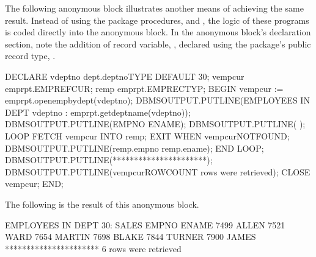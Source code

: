 \documentclass[letterpaper,10pt,english,openany,oneside]{sphinxmanual}
\begin{document}
The following anonymous block illustrates another means of achieving the
same result. Instead of using the package procedures,  and
, the logic of these programs is coded directly into the
anonymous block. In the anonymous block’s declaration section, note the
addition of record variable, , declared using the package’s public
record type, .

%
\begin{sphinxVerbatim}[commandchars=\\\{\}]
DECLARE
    v\PYGZus{}deptno     dept.deptno\PYGZpc{}TYPE DEFAULT 30;
    v\PYGZus{}emp\PYGZus{}cur    emp\PYGZus{}rpt.EMP\PYGZus{}REFCUR;
    r\PYGZus{}emp        emp\PYGZus{}rpt.EMPREC\PYGZus{}TYP;
BEGIN
   v\PYGZus{}emp\PYGZus{}cur := emp\PYGZus{}rpt.open\PYGZus{}emp\PYGZus{}by\PYGZus{}dept(v\PYGZus{}deptno);
   DBMS\PYGZus{}OUTPUT.PUT\PYGZus{}LINE(\PYGZsq{}EMPLOYEES IN DEPT \PYGZsh{}\PYGZsq{} \textbar{}\textbar{} v\PYGZus{}deptno \textbar{}\textbar{}
       \PYGZsq{}: \PYGZsq{} \textbar{}\textbar{} emp\PYGZus{}rpt.get\PYGZus{}dept\PYGZus{}name(v\PYGZus{}deptno));
   DBMS\PYGZus{}OUTPUT.PUT\PYGZus{}LINE(\PYGZsq{}EMPNO ENAME\PYGZsq{});
   DBMS\PYGZus{}OUTPUT.PUT\PYGZus{}LINE(\PYGZsq{}\PYGZhy{}\PYGZhy{}\PYGZhy{}\PYGZhy{}\PYGZhy{} \PYGZhy{}\PYGZhy{}\PYGZhy{}\PYGZhy{}\PYGZhy{}\PYGZhy{}\PYGZhy{}\PYGZsq{});
   LOOP
       FETCH v\PYGZus{}emp\PYGZus{}cur INTO r\PYGZus{}emp;
       EXIT WHEN v\PYGZus{}emp\PYGZus{}cur\PYGZpc{}NOTFOUND;
       DBMS\PYGZus{}OUTPUT.PUT\PYGZus{}LINE(r\PYGZus{}emp.empno \textbar{}\textbar{} \PYGZsq{} \PYGZsq{} \textbar{}\textbar{}
       r\PYGZus{}emp.ename);
   END LOOP;
   DBMS\PYGZus{}OUTPUT.PUT\PYGZus{}LINE(\PYGZsq{}**********************\PYGZsq{});
   DBMS\PYGZus{}OUTPUT.PUT\PYGZus{}LINE(v\PYGZus{}emp\PYGZus{}cur\PYGZpc{}ROWCOUNT \textbar{}\textbar{} \PYGZsq{} rows were retrieved\PYGZsq{});
   CLOSE v\PYGZus{}emp\PYGZus{}cur;
END;
\end{sphinxVerbatim}

\newpage

The following is the result of this anonymous block.

%
\begin{sphinxVerbatim}[commandchars=\\\{\}]
EMPLOYEES IN DEPT \PYGZsh{}30: SALES
EMPNO ENAME
\PYGZhy{}\PYGZhy{}\PYGZhy{}\PYGZhy{}\PYGZhy{} \PYGZhy{}\PYGZhy{}\PYGZhy{}\PYGZhy{}\PYGZhy{}\PYGZhy{}\PYGZhy{}
7499 ALLEN
7521 WARD
7654 MARTIN
7698 BLAKE
7844 TURNER
7900 JAMES
**********************
6 rows were retrieved
\end{sphinxVerbatim}
\end{document}
